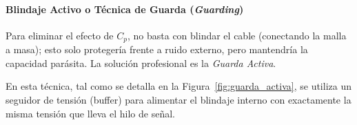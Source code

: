 \paragraph{Blindaje Activo o Técnica de Guarda (\textit{Guarding})}
Para eliminar el efecto de $C_p$, no basta con blindar el cable (conectando la malla a masa); esto solo protegería frente a ruido externo, pero mantendría la capacidad parásita. La solución profesional es la \emph{Guarda Activa}.


En esta técnica, tal como se detalla en la Figura~\ref{fig:guarda_activa}, se utiliza un seguidor de tensión (buffer) para alimentar el blindaje interno con exactamente la misma tensión que lleva el hilo de señal.

        
        
        
        
        

